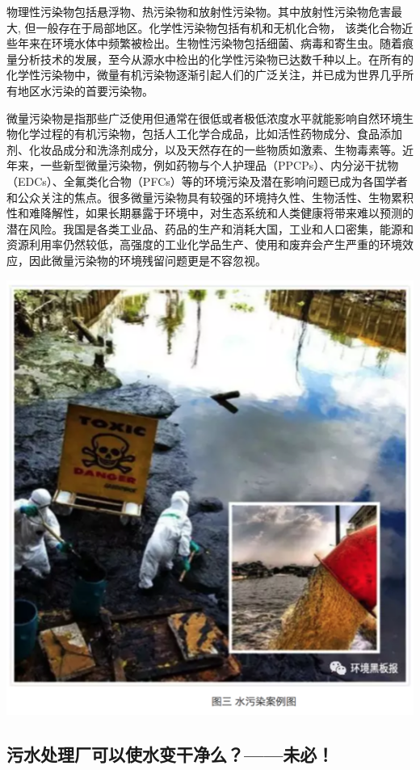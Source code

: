 \documentclass[
]{book}
\begin{document}
物理性污染物包括悬浮物、热污染物和放射性污染物。其中放射性污染物危害最大, 但一般存在于局部地区。化学性污染物包括有机和无机化合物， 该类化合物近些年来在环境水体中频繁被检出。生物性污染物包括细菌、病毒和寄生虫。随着痕量分析技术的发展，至今从源水中检出的化学性污染物已达数千种以上。在所有的化学性污染物中，微量有机污染物逐渐引起人们的广泛关注，并已成为世界几乎所有地区水污染的首要污染物。

微量污染物是指那些广泛使用但通常在很低或者极低浓度水平就能影响自然环境生物化学过程的有机污染物，包括人工化学合成品，比如活性药物成分、食品添加剂、化妆品成分和洗涤剂成分，以及天然存在的一些物质如激素、生物毒素等。近年来，一些新型微量污染物，例如药物与个人护理品（PPCPs）、内分泌干扰物（EDCs）、全氟类化合物（PFCs）等的环境污染及潜在影响问题已成为各国学者和公众关注的焦点。很多微量污染物具有较强的环境持久性、生物活性、生物累积性和难降解性，如果长期暴露于环境中，对生态系统和人类健康将带来难以预测的潜在风险。我国是各类工业品、药品的生产和消耗大国，工业和人口密集，能源和资源利用率仍然较低，高强度的工业化学品生产、使用和废弃会产生严重的环境效应，因此微量污染物的环境残留问题更是不容忽视。

\includegraphics[width=7.81in]{images/dushui3}

\hypertarget{ux6c61ux6c34ux5904ux7406ux5382ux53efux4ee5ux4f7fux6c34ux53d8ux5e72ux51c0ux4e48ux672aux5fc5}{%
\subsection{污水处理厂可以使水变干净么？------未必！}\label{ux6c61ux6c34ux5904ux7406ux5382ux53efux4ee5ux4f7fux6c34ux53d8ux5e72ux51c0ux4e48ux672aux5fc5}}
\end{document}
